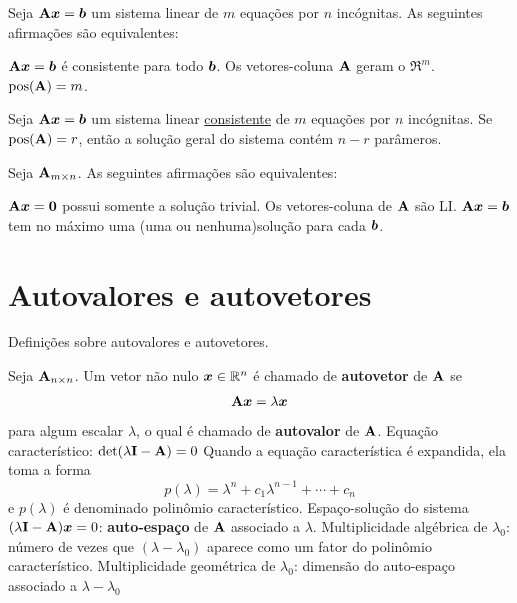 \begin{theorem}Seja $\mathbf{A}\bm{x}=\bm{b}$ um sistema linear de $m$ equações por $n$ incógnitas. As seguintes afirmações são equivalentes:
	\leavevmode
	\begin{outline}[enumerate]
		\1 $\mathbf{A}\bm{x}=\bm{b}$ é consistente para todo $\bm{b}$.
		\1 Os vetores-coluna $\mathbf{A}$ geram o $\Re^m$.
		\1 $\operatorname{pos}(\mathbf{A})=m$. 
	\end{outline}
\end{theorem}

\begin{theorem}Seja $\mathbf{A}\bm{x}=\bm{b}$ um sistema linear \underline{consistente} de $m$ equações por $n$ incógnitas. Se $\operatorname{pos}(\mathbf{A})=r$, então a solução geral do sistema contém $n-r$ parâmeros.
\end{theorem}

\begin{theorem} Seja $\mathbf{A}_{m\times n}$. As seguintes afirmações são equivalentes:
	\leavevmode
	\begin{outline}[enumerate]
		\1 $\mathbf{A}\bm{x}=\bm{0}$ possui somente a solução trivial.
		\1 Os vetores-coluna de $\mathbf{A}$ são LI.
		\1 $\mathbf{A}\bm{x}=\bm{b}$ tem no máximo uma (uma ou nenhuma)solução para cada $\bm{b}$.
	\end{outline}
\end{theorem}





\section{Autovalores e autovetores}

\begin{definition} Definições sobre autovalores e autovetores.
	\leavevmode
	\begin{outline}[enumerate]
		\1 Seja $\mathbf{A}_{n\times n}$. Um vetor não nulo $\bm{x}\in \mathbb{R}^n$ é chamado de     \textbf{autovetor} de $\mathbf{A}$ se 
			\begin{equation}
				\mathbf{A} \bm{x} = \lambda \bm{x}
			\end{equation}
		para algum escalar $\lambda$, o qual é chamado de \textbf{autovalor} de $\mathbf{A}$.
		\1 Equação característico: $\det(\lambda \mathbf{I} - \mathbf{A})=0$
		\1 Quando a equação característica é expandida, ela toma a forma
			\begin{equation}
				p(\lambda) = \lambda^n + c_1\lambda^{n-1} + \cdots + c_n
			\end{equation}
		e $p(\lambda)$ é denominado polinômio característico.
		\1 Espaço-solução do sistema $(\lambda \mathbf{I} - \mathbf{A})\bm{x}=0$: \textbf{auto-espaço} de $\mathbf{A}$ associado a $\lambda$.
		\1 Multiplicidade algébrica de $\lambda_0$: número de vezes que $(\lambda - \lambda_0)$ aparece como um fator do polinômio característico.
		\1 Multiplicidade geométrica de $\lambda_0$: dimensão do auto-espaço associado a $\lambda-\lambda_0$
	\end{outline}
\end{definition}

